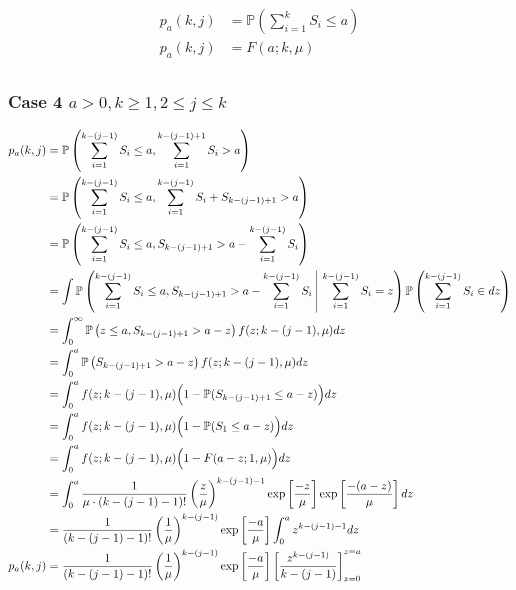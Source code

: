 \documentclass{article}
\begin{document}
\begin{align*}
	p_{a} (k, j) & = \mathbb{P} \left( \sum_{i = 1}^{k} S_{i} \leq a \right) \\
	p_{a} (k, j) & = F (a; k, \mu) \\
\end{align*}

\subsubsection{Case 4 $a > 0, k \geq 1, 2 \leq j \leq k$}

\begin{align*}
	p_{a} (k, j) & = \mathbb{P} \left( \sum_{i = 1}^{k - (j - 1)} S_{i} \leq a, \sum_{i = 1}^{k - (j - 1) + 1} S_{i} > a \right) \\
	& = \mathbb{P} \left( \sum_{i = 1}^{k - (j - 1)} S_{i} \leq a, \sum_{i = 1}^{k - (j - 1)} S_{i} + S_{k - (j - 1) + 1} > a \right) \\
	& = \mathbb{P} \left( \sum_{i = 1}^{k - (j - 1)} S_{i} \leq a, S_{k - (j - 1) + 1} > a - \sum_{i = 1}^{k - (j - 1)} S_{i} \right) \\
	& = \int \mathbb{P} \left( \sum_{i = 1}^{k - (j - 1)} S_{i} \leq a, S_{k - (j - 1) + 1} > a - \sum_{i = 1}^{k - (j - 1)} S_{i} \ \vline \ \sum_{i = 1}^{k - (j - 1)} S_{i} = z \right) \mathbb{P} \left( \sum_{i = 1}^{k - (j - 1)} S_{i} \in d z \right) \\
	& = \int_{0}^{\infty} \mathbb{P} \left( z \leq a, S_{k - (j - 1) + 1} > a - z \right) f (z; k - (j - 1), \mu) d z \\
	& = \int_{0}^{a} \mathbb{P} \left( S_{k - (j - 1) + 1} > a - z \right) f (z; k - (j - 1), \mu) d z \\
	& = \int_{0}^{a} f (z; k - (j - 1), \mu) \Big( 1 - \mathbb{P} (S_{k - ( j - 1) + 1} \leq a - z) \Big) d z \\
	& = \int_{0}^{a} f (z; k - (j - 1), \mu) \Big( 1 - \mathbb{P} (S_{1} \leq a - z) \Big) d z \\
	& = \int_{0}^{a} f (z; k - (j - 1), \mu) \Big( 1 - F (a - z; 1, \mu) \Big) d z \\
	& = \int_{0}^{a} \frac{1}{\mu \cdot (k - (j - 1) - 1)!} \left( \frac{z}{\mu} \right)^{k - (j - 1) - 1} \exp \left[ \frac{-z}{\mu} \right] \exp \left[ \frac{- (a - z)}{\mu} \right] d z \\
	& = \frac{1}{(k - (j - 1) - 1)!} \left( \frac{1}{\mu} \right)^{k - (j - 1)} \exp \left[ \frac{-a}{\mu} \right] \int_{0}^{a} z^{k - (j - 1) - 1} d z \\
	p_{a} (k, j) & = \frac{1}{(k - (j - 1) - 1)!} \left( \frac{1}{\mu} \right)^{k - (j - 1)} \exp \left[ \frac{-a}{\mu} \right] \left[ \frac{z^{k - (j - 1)}}{k - (j - 1)} \right]_{z = 0}^{z = a} \\
\end{align*}
\end{document}
